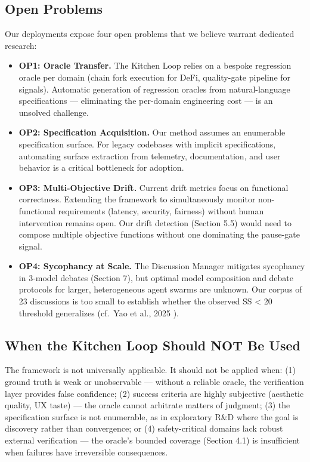 \documentclass[11pt,a4paper]{article}
\begin{document}
\subsection{Open Problems}\label{sec:open-problems}

Our deployments expose four open problems that we believe warrant dedicated research:

\begin{itemize}
\item
  \textbf{OP1: Oracle Transfer.} The Kitchen Loop relies on a bespoke regression oracle per domain (chain fork execution for DeFi, quality-gate pipeline for signals). Automatic generation of regression oracles from natural-language specifications --- eliminating the per-domain engineering cost --- is an unsolved challenge.
\item
  \textbf{OP2: Specification Acquisition.} Our method assumes an enumerable specification surface. For legacy codebases with implicit specifications, automating surface extraction from telemetry, documentation, and user behavior is a critical bottleneck for adoption.
\item
  \textbf{OP3: Multi-Objective Drift.} Current drift metrics focus on functional correctness. Extending the framework to simultaneously monitor non-functional requirements (latency, security, fairness) without human intervention remains open. Our drift detection (Section 5.5) would need to compose multiple objective functions without one dominating the pause-gate signal.
\item
  \textbf{OP4: Sycophancy at Scale.} The Discussion Manager mitigates sycophancy in 3-model debates (Section 7), but optimal model composition and debate protocols for larger, heterogeneous agent swarms are unknown. Our corpus of 23 discussions is too small to establish whether the observed SS < 20 threshold generalizes (cf.~Yao et al., 2025 \cite{yao2025}).
\end{itemize}

\subsection{When the Kitchen Loop Should NOT Be Used}\label{sec:when-the-kitchen-loop-should-not-be-used}

The framework is not universally applicable. It should not be applied when: (1) ground truth is weak or unobservable --- without a reliable oracle, the verification layer provides false confidence; (2) success criteria are highly subjective (aesthetic quality, UX taste) --- the oracle cannot arbitrate matters of judgment; (3) the specification surface is not enumerable, as in exploratory R\&D where the goal is discovery rather than convergence; or (4) safety-critical domains lack robust external verification --- the oracle's bounded coverage (Section 4.1) is insufficient when failures have irreversible consequences.
\end{document}
